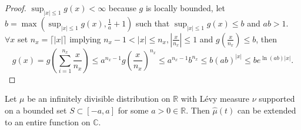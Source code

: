 \documentclass[a4paper,11pt]{article}
\begin{document}
\begin{proof}
    $\sup _{|x| \leq 1} g(x) < \infty$ because $g$ is locally bounded, let $b = \max(\sup _{|x| \leq 1} g(x),\frac{1}{a}+1)$ such that $\sup _{|x| \leq 1} g(x)\le b$ and $ab>1$.
    $\forall x$ set $n_x = \lceil \left| x \right| \rceil$ implying $n_x-1 < \left| x \right| \leq n_x, |\frac{x}{n_x}|\le 1$ and $g(\frac{x}{n _{x}})\le b$, then
    \begin{equation}
        g(x) = g\left(\sum_{i=1}^{n_x} \frac{x}{n_x}\right)
        \leq a^{n_x-1} g\left(\frac{x}{n_x} \right)^{n_x} \leq a^{n_x-1} b^{n_x} \leq b(a b)^{|x|}
        \le b e^{\ln \left(ab\right)|x|}.
    \end{equation}
\end{proof}

\begin{lemma}\label{lem:supp entire}
    Let $\mu$ be an infinitely divisible distribution on $\mathbb{R} $ with Lévy measure $\nu$
    supported on a bounded set $S\subset[-a, a]$ for some $a>0 \in \mathbb{R}$.
    Then $\widehat{\mu}(t)$ can be extended to an entire function on $\mathbb{C}$.
\end{lemma}
\end{document}
